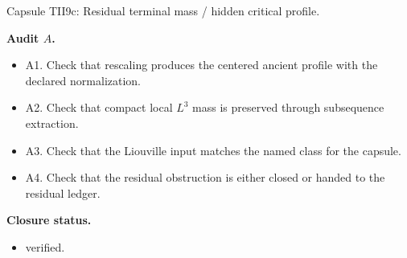\documentclass[11pt]{amsart}
\newcommand{\capsulefield}[1]{\par\smallskip\noindent\textbf{#1.}\ }
\begin{document}
\begin{proofcapsule}{Capsule TII9c: Residual terminal mass / hidden critical profile.}
  \capsulefield{Audit \(A\)}
  \begin{itemize}[leftmargin=1.8em]
  \item A1. Check that rescaling produces the centered ancient profile with the declared normalization.
  \item A2. Check that compact local $L^3$ mass is preserved through subsequence extraction.
  \item A3. Check that the Liouville input matches the named class for the capsule.
  \item A4. Check that the residual obstruction is either closed or handed to the residual ledger.
  \end{itemize}
  \capsulefield{Closure status}
  \begin{itemize}[leftmargin=1.8em]
  \item verified.
  \end{itemize}
\end{proofcapsule}
\end{document}

